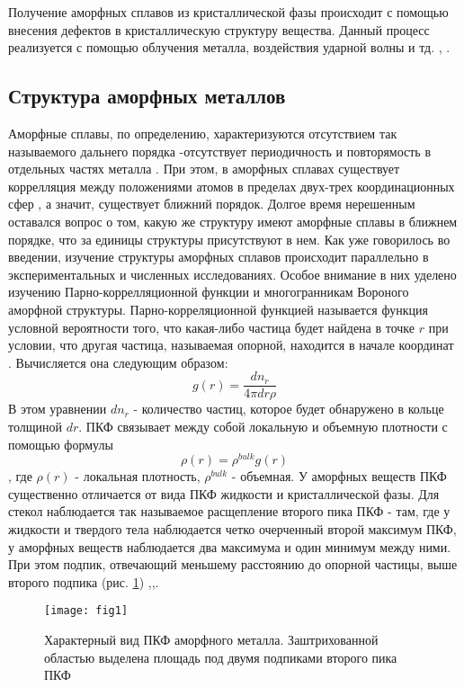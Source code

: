 Получение аморфных сплавов из кристаллической фазы происходит с помощью внесения дефектов в кристаллическую структуру вещества. Данный процесс реализуется с помощью облучения металла, воздействия ударной волны и тд. \cite{Kalin}, \cite{Sudzuki}.

\subsection{Структура аморфных металлов}
Аморфные сплавы, по определению, характеризуются отсутствием так называемого дальнего порядка -отсутствует периодичность и повторямость в отдельных частях металла \cite{Prokhorov}. При этом, в аморфных сплавах существует коррелляция между положениями атомов в пределах  двух-трех координационных сфер \cite{Glezer2002}, а значит, существует ближний порядок.  Долгое время нерешенным оставался вопрос о том, какую же структуру имеют аморфные сплавы в ближнем порядке, что за единицы структуры присутствуют в нем. Как уже говорилось во введении, изучение структуры аморфных сплавов происходит параллельно в экспериментальных и численных исследованиях. Особое внимание в них уделено изучению Парно-коррелляционной функции и многогранникам Вороного аморфной структуры. Парно-корреляционной функцией называется функция условной вероятности того, что какая-либо частица будет найдена в точке $r$ при условии, что другая частица, называемая опорной, находится в начале координат \cite{Chandler}. Вычисляется она следующим образом:
\begin{equation}
	g(r) = \frac{dn_r}{4\pi dr \rho}
\end{equation}
В этом уравнении $dn_r$ - количество частиц, которое будет обнаружено в кольце толщиной $dr$. ПКФ связывает между собой локальную и объемную плотности с помощью формулы
\begin{equation}
	\rho(r) =\rho^{bulk}g(r) 
\end{equation},
где $\rho(r)$ - локальная плотность, $\rho^{bulk}$ - объемная. 
У аморфных веществ ПКФ существенно отличается от вида ПКФ жидкости и кристаллической фазы. Для стекол наблюдается так называемое расщепление второго пика ПКФ - там, где у жидкости и твердого тела наблюдается четко очерченный второй максимум ПКФ, у аморфных веществ наблюдается два максимума и один минимум между ними. При этом подпик, отвечающий меньшему расстоянию до опорной частицы, выше второго подпика (рис. \ref{Square}) \cite{Pan},\cite{Kolotova},\cite{Liu}. 
\begin{figure}[h!]
	\begin{center}
		\texttt{[image: fig1]}{}{} {}
		\caption{Характерный вид ПКФ аморфного металла. Заштрихованной областью выделена площадь под  двумя подпиками второго пика ПКФ}
		\label{Square}
	\end{center} 
\end{figure}
